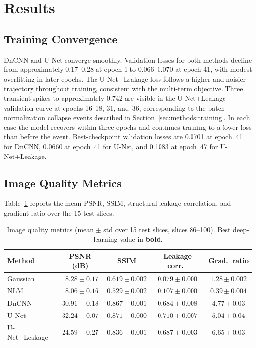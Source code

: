 \documentclass[review,12pt]{elsarticle}
\begin{document}
\section{Results}
\label{sec:results}

\subsection{Training Convergence}
\label{sec:results:convergence}

DnCNN and U-Net converge smoothly.  Validation losses for both methods
decline from approximately 0.17--0.28 at epoch 1 to 0.066--0.070 at
epoch 41, with modest overfitting in later epochs.  The U-Net+Leakage
loss follows a higher and noisier trajectory throughout training,
consistent with the multi-term objective.  Three transient spikes to
approximately 0.742 are visible in the U-Net+Leakage validation curve
at epochs 16--18, 31, and~36, corresponding to the batch normalization
collapse events described in Section~\ref{sec:methods:training}.  In
each case the model recovers within three epochs and continues training
to a lower loss than before the event.  Best-checkpoint validation
losses are 0.0701 at epoch~41 for DnCNN, 0.0660 at epoch~41 for
U-Net, and 0.1083 at epoch~47 for U-Net+Leakage.

\subsection{Image Quality Metrics}
\label{sec:results:image_quality}

Table~\ref{tab:quality} reports the mean PSNR, SSIM, structural leakage
correlation, and gradient ratio over the 15 test slices.

\begin{table}[ht]
\centering
\caption{Image quality metrics (mean $\pm$ std over 15 test slices,
         slices 86--100).  Best deep-learning value in \textbf{bold}.}
\label{tab:quality}
\small
\setlength{\tabcolsep}{4pt}
\begin{tabular}{@{}lcccc@{}}
\toprule
Method            & PSNR (dB)          & SSIM                & Leakage corr.\      & Grad.\ ratio       \\
\midrule
Gaussian          & $18.28 \pm 0.17$   & $0.619 \pm 0.002$   & $0.079 \pm 0.000$   & $1.28 \pm 0.002$   \\
NLM               & $18.06 \pm 0.16$   & $0.529 \pm 0.002$   & $0.107 \pm 0.000$   & $0.39 \pm 0.004$   \\
DnCNN             & $30.91 \pm 0.18$   & $0.867 \pm 0.001$   & $0.684 \pm 0.008$   & $4.77 \pm 0.03$    \\
U-Net             & $\mathbf{32.24 \pm 0.07}$ & $\mathbf{0.871 \pm 0.000}$ & $0.710 \pm 0.007$ & $5.04 \pm 0.04$  \\
U-Net+Leakage     & $24.59 \pm 0.27$   & $0.836 \pm 0.001$   & $\mathbf{0.687 \pm 0.003}$ & $6.65 \pm 0.03$ \\
\bottomrule
\end{tabular}
\end{table}
\end{document}

